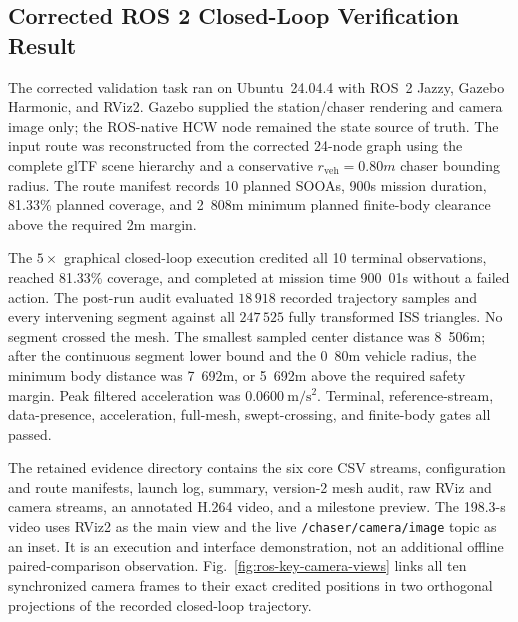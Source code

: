 \subsection{Corrected ROS 2 Closed-Loop Verification Result}
\label{sec:ros-verification-results}

The corrected validation task ran on Ubuntu~24.04.4 with ROS~2 Jazzy,
Gazebo Harmonic, and RViz2. Gazebo supplied the station/chaser rendering and
camera image only; the ROS-native HCW node remained the state source of truth.
The input route was reconstructed from the corrected 24-node graph using the
complete glTF scene hierarchy and a conservative
$r_{\mathrm{veh}}=\unit{0.80}{m}$ chaser bounding radius. The route manifest
records 10 planned SOOAs, \unit{900}{s} mission duration, 81.33\% planned
coverage, and \unit{2.808}{m} minimum planned finite-body clearance above the
required \unit{2}{m} margin.

The $5\times$ graphical closed-loop execution credited all 10 terminal
observations, reached 81.33\% coverage, and completed at mission time
\unit{900.01}{s} without a failed action. The post-run audit evaluated $18\,918$
recorded trajectory samples and every intervening segment against all $247\,525$
fully transformed ISS triangles. No segment crossed the mesh. The smallest
sampled center distance was \unit{8.506}{m}; after the continuous segment lower
bound and the \unit{0.80}{m} vehicle radius, the minimum body distance was
\unit{7.692}{m}, or \unit{5.692}{m} above the required safety margin. Peak
filtered acceleration was $0.0600~\mathrm{m/s^2}$. Terminal, reference-stream,
data-presence, acceleration, full-mesh, swept-crossing, and finite-body gates
all passed.

The retained evidence directory contains the six core CSV streams,
configuration and route manifests, launch log, summary, version-2 mesh audit,
raw RViz and camera streams, an annotated H.264 video, and a milestone preview.
The 198.3-s video uses RViz2 as the main view and the live
\texttt{/chaser/camera/image} topic as an inset. It is an execution and
interface demonstration, not an additional offline paired-comparison observation.
Fig.~\ref{fig:ros-key-camera-views} links all ten synchronized camera frames
to their exact credited positions in two orthogonal projections of the recorded
closed-loop trajectory.

